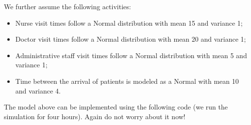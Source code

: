 \documentclass[
]{book}
\begin{document}
We further assume the following activities:

\begin{itemize}
\item
  Nurse visit times follow a Normal distribution with mean 15 and variance 1;
\item
  Doctor visit times follow a Normal distribution with mean 20 and variance 1;
\item
  Administrative staff visit times follow a Normal distribution with mean 5 and variance 1;
\item
  Time between the arrival of patients is modeled as a Normal with mean 10 and variance 4.
\end{itemize}

The model above can be implemented using the following code (we run the simulation for four hours). Again do not worry about it now!
\end{document}
